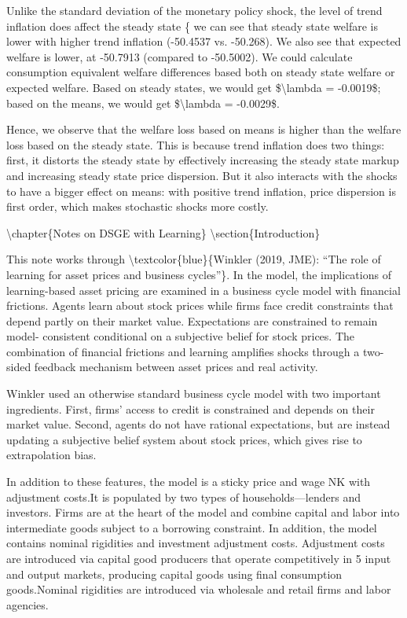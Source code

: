\documentclass[10pt,math=newtx,citestyle=gb7714-2015,bibstyle=gb7714-2015]{elegantbook}
\begin{document}
	Unlike the standard deviation of the monetary policy shock, the level of trend inflation does affect the steady state \{ we can see that steady state welfare is lower with higher trend inflation (-50.4537 vs. -50.268). We also see that expected welfare is lower, at -50.7913 (compared to -50.5002). We could calculate consumption equivalent welfare differences based both on steady state welfare or expected welfare. Based on steady states, we would get \$\textbackslash{}lambda = -0.0019\$; based on the means, we would get \$\textbackslash{}lambda = -0.0029\$.
	
	Hence, we observe that the welfare loss based on means is higher than the welfare loss based on the steady state. This is because trend inflation does two things: first, it distorts the steady state by effectively increasing the steady state markup and increasing steady state price dispersion. But it also interacts with the shocks to have a bigger effect on means: with positive trend inflation, price dispersion is first order, which makes stochastic shocks more costly.
	
	\textbackslash{}chapter\{Notes on DSGE with Learning\}
	\textbackslash{}section\{Introduction\}
	
	This note works through \textbackslash{}textcolor\{blue\}\{Winkler (2019, JME): ``The role of learning for asset prices and business cycles''\}. In the model, the implications of learning-based asset pricing are examined in a business cycle model with financial frictions. Agents learn about stock prices while firms face credit constraints that depend partly on their market value. Expectations are constrained to remain model- consistent conditional on a subjective belief for stock prices. The combination of financial frictions and learning amplifies shocks through a two-sided feedback mechanism between asset prices and real activity.
	
	Winkler used an otherwise standard business cycle model with two important ingredients. First, firms’ access to credit is constrained and depends on their market value. Second, agents do not have rational expectations, but are instead updating a subjective belief system about stock prices, which gives rise to extrapolation bias.
	
	In addition to these features, the model is a sticky price and wage NK with adjustment costs.It is populated by two types of households---lenders and investors. Firms are at the heart of the model and combine capital and labor into intermediate goods subject to a borrowing constraint. In addition, the model contains nominal rigidities and investment adjustment costs. Adjustment costs are introduced via capital good producers that operate competitively in
	5 input and output markets, producing capital goods using final consumption goods.Nominal rigidities are introduced via wholesale and retail firms and labor agencies.
	
\end{document}
